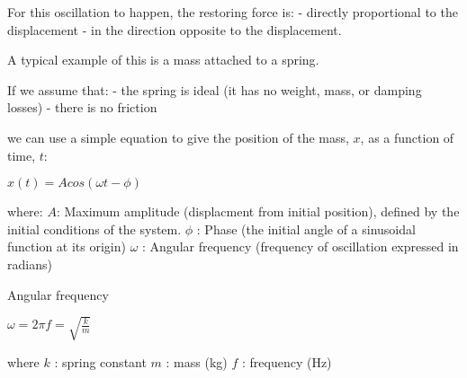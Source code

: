 \documentclass[11pt]{article}
\begin{document}
For this oscillation to happen, the restoring force is: - directly
proportional to the displacement - in the direction opposite to the
displacement.

    A typical example of this is a mass attached to a spring.

    If we assume that: - the spring is ideal (it has no weight, mass, or
damping losses) - there is no friction

we can use a simple equation to give the position of the mass, \(x\), as
a function of time, \(t\):

\(x(t) = A cos(\omega t - \phi)\)

where: \(A\): Maximum amplitude (displacment from initial position),
defined by the initial conditions of the system. \(\phi\) : Phase (the
initial angle of a sinusoidal function at its origin) \(\omega\) :
Angular frequency (frequency of oscillation expressed in radians)

    Angular frequency

\(\omega=2\pi f = \sqrt{\frac{k}{m}}\)

where \(k\) : spring constant \(m\) : mass (kg) \(f\) : frequency (Hz)
\end{document}
